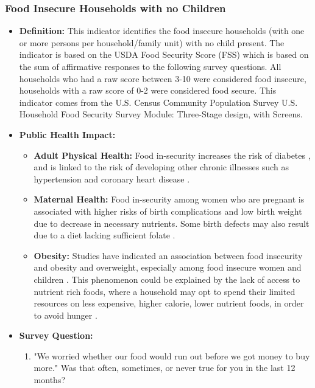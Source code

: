 \documentclass[12pt,letterpaper]{report}
\begin{document}
\subsubsection{Food Insecure Households with no Children} 
	\begin{itemize}
		\item \textbf{Definition:} This indicator identifies the food insecure households (with one or more persons per household/family unit) with no child present. The indicator is based on the USDA Food Security Score (FSS) which is based on the sum of affirmative responses to the following survey questions. All households who had a raw score between 3-10 were considered food insecure, households with a raw score of 0-2 were considered food secure. This indicator comes from the U.S. Census Community Population Survey U.S. Household Food Security Survey Module: Three-Stage design, with Screens.
		\item \textbf{Public Health Impact:}
\begin{itemize}
\item\textbf{Adult Physical Health:} Food in-security increases the risk of diabetes \cite{seligman2007food}, and is linked to the risk of developing other chronic illnesses such as hypertension and coronary heart disease \cite{seligman2010food}.
\item\textbf{Maternal Health:} Food in-security among women who are pregnant is associated with higher risks of birth complications and low birth weight due to decrease in necessary nutrients\cite{tarasuk2001household}. Some birth defects may also result due to a diet lacking sufficient folate \cite{bailey2010folate}.
\item\textbf{Obesity:}  Studies have indicated an association between food insecurity and obesity and overweight, especially among food insecure women and children \cite{townsend2001food} \cite{wilde2006individual} \cite{casey2006association} \cite{alaimo2001low} \cite{bronte2007food} \cite{martin2007food}. This phenomenon could be explained by the lack of access to nutrient rich foods, where a household may opt to spend their limited resources on less expensive, higher calorie, lower nutrient foods, in order to avoid hunger \cite{drewnowski2004poverty}. 
\end{itemize}
		\item \textbf{Survey Question:}
\begin{enumerate}
  \item "We worried whether our food would run out before we got money to buy more." Was that often, sometimes, or never true for you in the last 12 months?

\end{enumerate}
\end{itemize}
\end{document}
